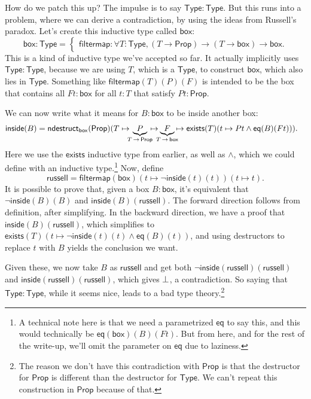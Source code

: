 \documentclass[11pt,paper=letter]{scrartcl}
\newcommand{\sf}{\mathsf}
\renewcommand{\land}{\wedge}
\renewcommand{\lnot}{\neg}
\newcommand{\prop}{\mathsf{Prop}}
\newcommand{\type}{\mathsf{Type}}
\newcommand{\sto}{\,\to\,}
\begin{document}
How do we patch this up? The impulse is to say $\type : \type$. But this runs into a problem, where we can derive a contradiction, by using the ideas from Russell's paradox. Let's create this inductive type called $\sf{box}$: \[
  \sf{box}: \type =
  \begin{cases}
  \sf{filtermap}: \forall T: \type, (T \to \prop) \to (T \to \sf{box}) \to \sf{box}.
  \end{cases}
\]
This is a kind of inductive type we've accepted so far. It actually implicitly uses $\type : \type$, because we are using $T$, which is a $\type$, to construct $\sf{box}$, which also lies in $\type$. Something like $\sf{filtermap}(T)(P)(F)$ is intended to be the box that contains all $Ft : \sf{box}$ for all $t : T$ that satisfy $Pt : \prop$.

We can now write what it means for $B : \sf{box}$ to be inside another box:
\begin{align*}
\sf{inside}(B) &=\sf{ndestruct}_{\sf{box}}(\prop)(
  T \mapsto
  \mkern-10mu
  \underbrace{P}_{T\sto \prop}
  \mkern-10mu
  \mapsto
  \mkern-10mu
  \underbrace{F}_{T\sto \sf{box}}
  \mkern-10mu
  \mapsto
  \sf{exists}(T)(t \mapsto Pt \land \sf{eq}(B)(Ft))
  ).
\end{align*}
Here we use the $\sf{exists}$ inductive type from earlier, as well as $\land$, which we could define with an inductive type.\footnote{A technical note here is that we need a parametrized $\sf{eq}$ to say this, and this would technically be $\sf{eq}(\sf{box})(B)(Ft)$. But from here, and for the rest of the write-up, we'll omit the parameter on $\sf{eq}$ due to laziness.} Now, define \[
  \sf{russell} = \sf{filtermap}(\sf{box})(t \mapsto \lnot \sf{inside}(t)(t))(t \mapsto t).
\]
It is possible to prove that, given a box $B : \sf{box}$, it's equivalent that $\lnot \sf{inside}(B)(B)$ and $\sf{inside}(B)(\sf{russell})$. The forward direction follows from definition, after simplifying. In the backward direction, we have a proof that $\sf{inside}(B)(\sf{russell})$, which simplifies to $\sf{exists}(T)(t \mapsto \lnot\sf{inside}(t)(t) \land \sf{eq}(B)(t))$, and using destructors to replace $t$ with $B$ yields the conclusion we want.

Given these, we now take $B$ as $\sf{russell}$ and get both $\lnot \sf{inside}(\sf{russell})(\sf{russell})$ and $\sf{inside}(\sf{russell})(\sf{russell})$, which gives $\bot$, a contradiction. So saying that $\type : \type$, while it seems nice, leads to a bad type theory.\footnote{The reason we don't have this contradiction with $\prop$ is that the destructor for $\prop$ is different than the destructor for $\type$. We can't repeat this construction in $\prop$ because of that.}
\end{document}
